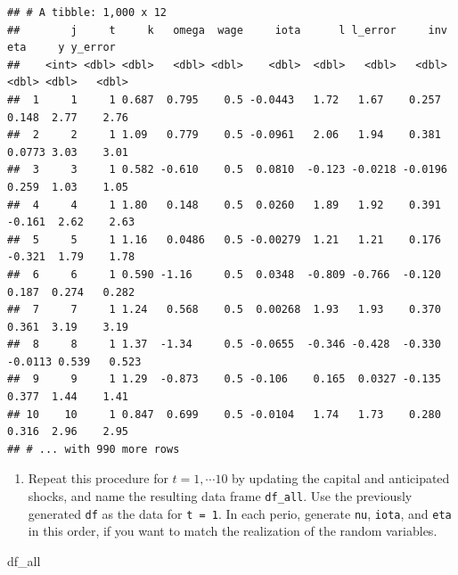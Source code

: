 \documentclass[
]{book}
\newenvironment{Shaded}{\begin{snugshade}}{\end{snugshade}}
\newcommand{\NormalTok}[1]{#1}
\providecommand{\tightlist}{%
  \setlength{\itemsep}{0pt}\setlength{\parskip}{0pt}}
\begin{document}
\begin{verbatim}
## # A tibble: 1,000 x 12
##        j     t     k   omega  wage     iota      l l_error     inv     eta     y y_error
##    <int> <dbl> <dbl>   <dbl> <dbl>    <dbl>  <dbl>   <dbl>   <dbl>   <dbl> <dbl>   <dbl>
##  1     1     1 0.687  0.795    0.5 -0.0443   1.72   1.67    0.257   0.148  2.77    2.76 
##  2     2     1 1.09   0.779    0.5 -0.0961   2.06   1.94    0.381   0.0773 3.03    3.01 
##  3     3     1 0.582 -0.610    0.5  0.0810  -0.123 -0.0218 -0.0196  0.259  1.03    1.05 
##  4     4     1 1.80   0.148    0.5  0.0260   1.89   1.92    0.391  -0.161  2.62    2.63 
##  5     5     1 1.16   0.0486   0.5 -0.00279  1.21   1.21    0.176  -0.321  1.79    1.78 
##  6     6     1 0.590 -1.16     0.5  0.0348  -0.809 -0.766  -0.120   0.187  0.274   0.282
##  7     7     1 1.24   0.568    0.5  0.00268  1.93   1.93    0.370   0.361  3.19    3.19 
##  8     8     1 1.37  -1.34     0.5 -0.0655  -0.346 -0.428  -0.330  -0.0113 0.539   0.523
##  9     9     1 1.29  -0.873    0.5 -0.106    0.165  0.0327 -0.135   0.377  1.44    1.41 
## 10    10     1 0.847  0.699    0.5 -0.0104   1.74   1.73    0.280   0.316  2.96    2.95 
## # ... with 990 more rows
\end{verbatim}

\begin{enumerate}
\def\labelenumi{\arabic{enumi}.}
\setcounter{enumi}{8}
\tightlist
\item
  Repeat this procedure for \(t = 1, \cdots 10\) by updating the capital and anticipated shocks, and name the resulting data frame \texttt{df\_all}. Use the previously generated \texttt{df} as the data for \texttt{t\ =\ 1}. In each perio, generate \texttt{nu}, \texttt{iota}, and \texttt{eta} in this order, if you want to match the realization of the random variables.
\end{enumerate}

\begin{Shaded}
\begin{Highlighting}[]
\NormalTok{df\_all}
\end{Highlighting}
\end{Shaded}
\end{document}
